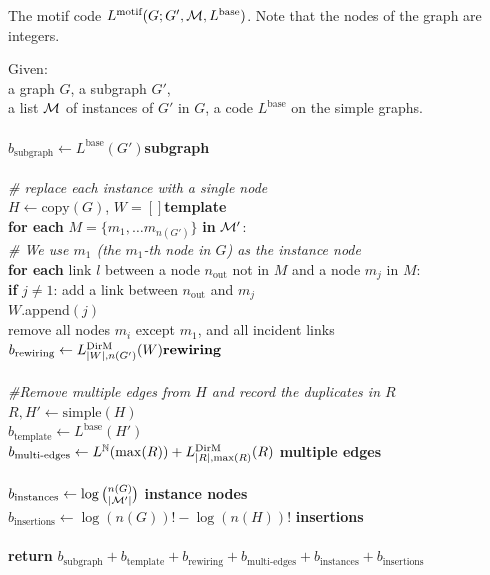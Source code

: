 \begin{pseudo}[th]
\caption{The motif code $L^\text{motif}(G ; G', {\cal M}, L^\text{base})$. Note that the nodes of the graph are integers.}
\label{algorithm:motif-code}
{ 
Given:\\ 
\tab a graph $G$, a subgraph $G'$,\\ 
\tab a list $\cal M$ of instances of $G'$ in $G$, a code $L^\text{base}$ on the simple graphs.\\
\\
$b_\text{subgraph} \leftarrow L^\text{base}(G')$\hfill \textbf{subgraph} \\
\\
\emph{\# replace each instance with a single node} \\
$H \leftarrow \text{copy}(G)$, $W = [] $\hfill \textbf{template} \\
\textbf{for each } $M = \{ m_1, \ldots m_{n(G')}\}$ \textbf{in} $\cal M'$:\\
\tab \emph{\# We use $m_1$ (the $m_1$-th node in $G$) as the instance node}\\
\tab \textbf{for each} link $l$ between a node $n_\text{out}$ not in $M$ and a node $m_j$ in $M$:\\
\tab \tab \textbf{if} $j \neq 1$: add a link between $n_\text{out}$ and $m_j$\\
\tab \tab $W$.append$(j)$\\
\tab remove all nodes $m_i$ except $m_1$, and all incident links\\
$b_\text{rewiring} \leftarrow  L^\text{DirM}_{|W|, n(G')}(W)\hfill\textbf{rewiring}$\\
\\
\emph{\#Remove multiple edges from $H$  and record the duplicates in $R$}\\
$R, H' \leftarrow \text{simple}(H)$ \\
$b_\text{template} \leftarrow L^\text{base}(H')$\\ 
$b_\text{multi-edges} \leftarrow L^{\mathbb N}(\max(R)) + L^\text{DirM}_{|R|, \max(R)}(R)$ \hfill \textbf{multiple edges}\\
\\
$b_\text{instances} \leftarrow \log {n(G) \choose |{\cal M'}|}$ \hfill \textbf{instance nodes}\\
$b_\text{insertions} \leftarrow \log (n(G))! - \log (n(H))!$ \hfill \textbf{insertions}\\    
\\
\textbf{return} $b_\text{subgraph} + b_\text{template} + b_\text{rewiring} + b_\text{multi-edges} + b_\text{instances} + b_\text{insertions}$\\
}
\end{pseudo} 

